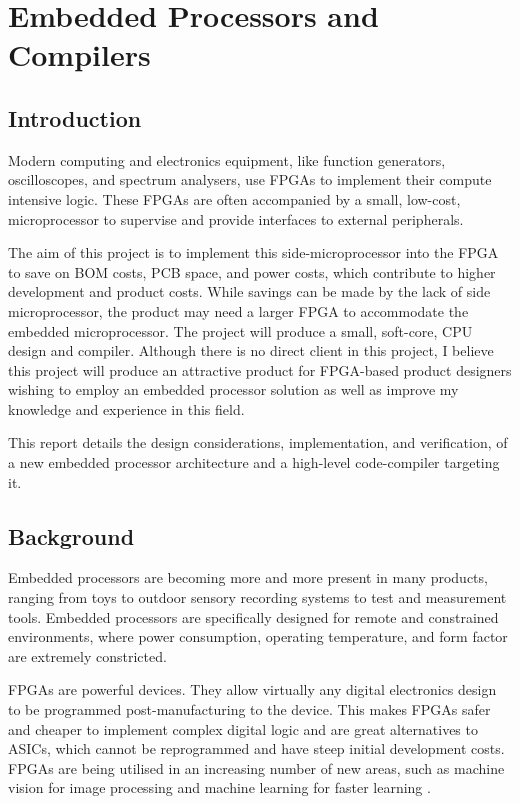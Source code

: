 \documentclass[11pt,a4paper]{report}
\begin{document}
\newpage
\chapter{Embedded Processors and Compilers}
{\hypersetup{linkcolor=black}
\startcontents[chapters]
}

\section{Introduction}
Modern computing and electronics equipment, like function generators, oscilloscopes, and spectrum analysers, use FPGAs to implement their compute intensive logic. These FPGAs are often accompanied by a small, low-cost, microprocessor to supervise and provide interfaces to external peripherals.

The aim of this project is to implement this side-microprocessor into the FPGA to save on BOM costs, PCB  space,  and  power  costs,  which  contribute  to  higher  development  and  product  costs.  While  savings can  be  made  by  the  lack  of  side  microprocessor,  the  product  may  need  a  larger  FPGA  to  accommodate the embedded microprocessor.  The project will produce a small, soft-core, CPU design and compiler. Although there is no direct client in this project, I believe this project will produce an attractive product for FPGA-based product designers wishing to employ an embedded processor solution as well as improve my knowledge and experience in this field.

This report details the design considerations, implementation, and verification, of a new embedded processor architecture and a high-level code-compiler targeting it.

\section{Background}
Embedded processors are becoming more and more present in many products, ranging from toys to outdoor sensory recording systems to test and measurement tools. Embedded processors are specifically designed for remote and constrained environments, where power consumption, operating temperature, and form factor are extremely constricted. 

FPGAs are powerful devices. They allow virtually any digital electronics design to be programmed post-manufacturing to the device. This makes FPGAs safer and cheaper to implement complex digital logic and are great alternatives to ASICs, which cannot be reprogrammed and have steep initial development costs. FPGAs are being utilised in an increasing number of new areas, such as machine vision for image processing and machine learning for faster learning  \cite{fpgacloud}.
 
\end{document}
